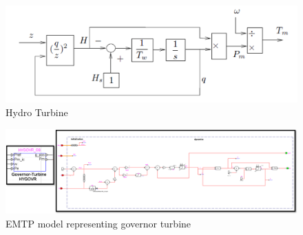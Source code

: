 \documentclass{report}
\begin{document}
\begin{figure}
    \centering
    \includegraphics[width=0.7\linewidth]{Figure_Nordic/HydroTurbine.png}
    \caption{Hydro Turbine}
    \label{fig:turbine}
\end{figure}
\begin{figure}
    \centering
    \includegraphics[width=1.0\linewidth]{Figure_Nordic/GovernorTurbineEMTP.png}
    \caption{EMTP model representing governor turbine}
    \label{fig:GovernorEMTP}
\end{figure}
\end{document}
